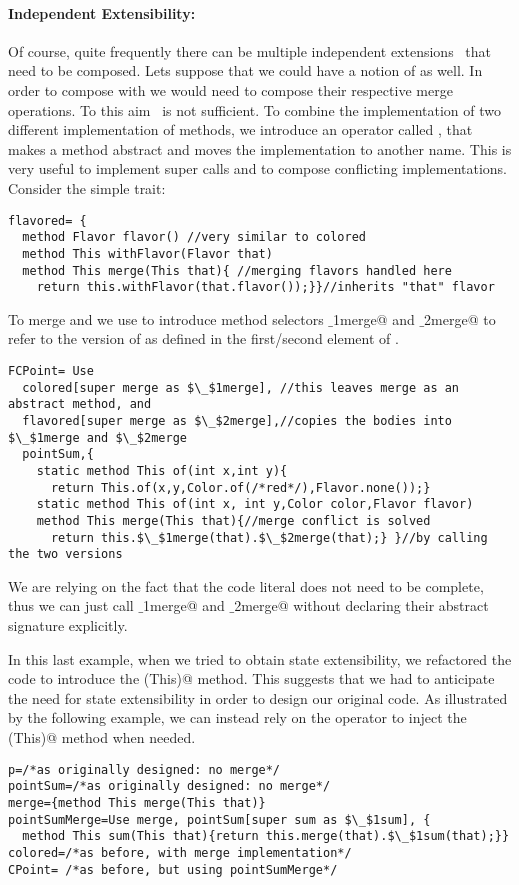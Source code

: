 \paragraph{Independent Extensibility:}
  Of course, quite frequently there can be multiple independent
  extensions~\cite{Zenger-Odersky2005} that need to be composed. Lets suppose that 
  we could have a notion of \Q@flavored@ as well.   
  In order to compose \Q@colored@ with \Q@flavored@ we would
  need to compose their respective merge operations. To this aim \use\ is not sufficient. To combine the implementation of two different implementation of methods, we introduce an operator called \Q@super@, that
 makes a method abstract and
moves the implementation to another name. This is very useful to implement super calls
 and to compose conflicting implementations.
Consider the simple \Q@flavored@ trait:
 \begin{lstlisting}
flavored= {
  method Flavor flavor() //very similar to colored
  method This withFlavor(Flavor that)
  method This merge(This that){ //merging flavors handled here
    return this.withFlavor(that.flavor());}}//inherits "that" flavor
\end{lstlisting}  
To merge \Q@colored@ and \Q@flavored@ we use  \Q@super@ to introduce method selectors \Q@$\_$1merge@ and \Q@$\_$2merge@
to refer to the version of \Q@merge@ as defined in the first/second element of \use.
 \begin{lstlisting}
FCPoint= Use
  colored[super merge as $\_$1merge], //this leaves merge as an abstract method, and
  flavored[super merge as $\_$2merge],//copies the bodies into $\_$1merge and $\_$2merge
  pointSum,{
    static method This of(int x,int y){
      return This.of(x,y,Color.of(/*red*/),Flavor.none());}
    static method This of(int x, int y,Color color,Flavor flavor)
    method This merge(This that){//merge conflict is solved 
      return this.$\_$1merge(that).$\_$2merge(that);} }//by calling the two versions
\end{lstlisting}  
We are relying on the fact that the code literal
 does not need to be complete, 
thus we can just call \Q@$\_$1merge@ and \Q@$\_$2merge@ without
 declaring their abstract signature explicitly.

In this last example, when we tried to obtain state extensibility, we refactored the code to introduce  the \Q@merge(This)@ method.
This suggests that we had to
anticipate the need for state extensibility
in order to design our original code.
As illustrated by the following example, we can instead rely on the \Q@super@ operator to inject the \Q@merge(This)@ method when needed.
 \begin{lstlisting}
p=/*as originally designed: no merge*/
pointSum=/*as originally designed: no merge*/
merge={method This merge(This that)}
pointSumMerge=Use merge, pointSum[super sum as $\_$1sum], { 
  method This sum(This that){return this.merge(that).$\_$1sum(that);}}
colored=/*as before, with merge implementation*/
CPoint= /*as before, but using pointSumMerge*/
\end{lstlisting}  

